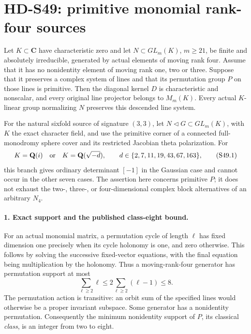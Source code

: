 \section{HD-S49: primitive monomial rank-four sources}
\label{sec:monomial-rank-four-scope}

Let \(K\subset\mathbf C\) have characteristic zero and let
\(N\subset GL_m(K)\), \(m\ge21\), be finite and absolutely
irreducible, generated by actual elements of moving rank four.
Assume that it has no nonidentity element of moving rank one,
two or three. Suppose that it preserves a complex system of
lines and that its permutation group \(P\) on those lines is
primitive. Then the diagonal kernel \(D\) is characteristic
and nonscalar, and every original line projector belongs to
\(M_m(K)\). Every actual \(K\)-linear group normalizing
\(N\) preserves this descended line system.

For the natural sixfold source of signature \((3,3)\), let
\(N\triangleleft G\subset GL_m(K)\), with \(K\) the
exact character field, and use the primitive corner of a
connected full-monodromy sphere cover and its restricted
Jacobian theta polarization. For
\[
 K=\mathbf Q(i)\quad\hbox{or}\quad
 K=\mathbf Q(\sqrt{-d}),\qquad
 d\in\{2,7,11,19,43,67,163\},                         \tag{S49.1}
\]
this branch gives ordinary determinant \([-1]\) in the
Gaussian case and cannot occur in the other seven cases.
The assertion here concerns primitive \(P\); it does not
exhaust the two-, three-, or four-dimensional complex block
alternatives of an arbitrary \(N_4\).

\paragraph{1. Exact support and the published class-eight bound.}
For an actual monomial matrix, a permutation cycle of length
\(\ell\) has fixed dimension one precisely when its cycle
holonomy is one, and zero otherwise. This follows by solving
the successive fixed-vector equations, with the final equation
being multiplication by the holonomy. Thus a moving-rank-four
generator has permutation support at most
\[
      \sum_{\ell\ge2}\ell
      \le2\sum_{\ell\ge2}(\ell-1)\le8.                \tag{S49.2}
\]
The permutation action is transitive: an orbit sum of the
specified lines would otherwise be a proper invariant
subspace. Some generator has a nonidentity permutation.
Consequently the minimum nonidentity support of \(P\),
its classical \emph{class}, is an integer from two to eight.

